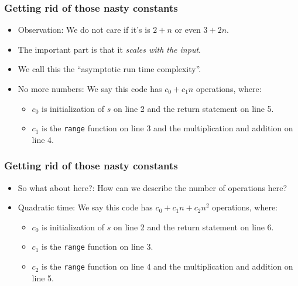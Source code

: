 \begin{frame}
	\frametitle{Getting rid of those nasty constants}

	\begin{itemize}
		\item Observation: We do not care if it's is $2+n$ or even $3+2n$.
		\item The important part is that it \textit{scales with the input}.
			
		\item We call this the ``asymptotic run time complexity''.

		\item No more numbers:		We say this code has $c_0 + c_1n$ operations, where:
		\begin{itemize}
			\item $c_0$ is initialization of $s$ on line 2 and the return statement on line 5.
			\item $c_1$ is the \texttt{range} function on line 3 and the multiplication and addition on line 4.
		\end{itemize}
	\end{itemize}
	
	
	
\end{frame}

\begin{frame}
	\frametitle{Getting rid of those nasty constants}

	\begin{itemize}
		\item So what about here?:	How can we describe the number of operations here?	
		\item Quadratic time:
				We say this code has $c_0 + c_1n + c_2 n^2$ operations, where:
				\begin{itemize}
					\item $c_0$ is initialization of $s$ on line 2 and the return statement on line 6.
					\item $c_1$ is the \texttt{range} function on line 3.
					\item $c_2$ is the \texttt{range} function on line 4 and the multiplication and addition on line 5.
				\end{itemize}
			\end{itemize}
			

			
\end{frame}

